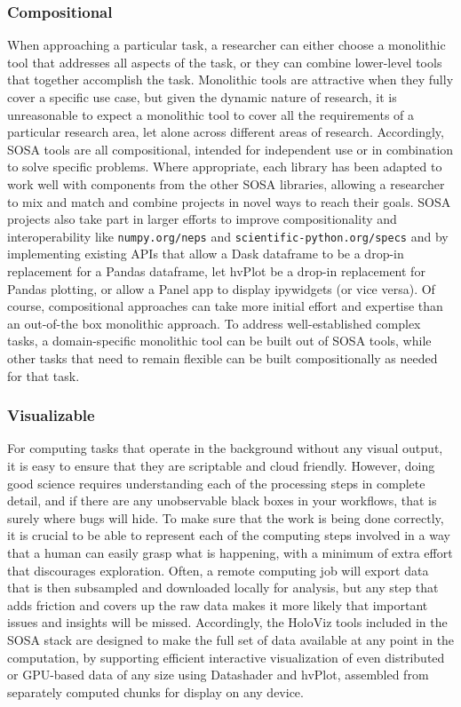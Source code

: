\subsubsection{Compositional}
When approaching a particular task, a researcher can either choose a monolithic tool that addresses all aspects of the task, or they can combine lower-level tools that together accomplish the task. Monolithic tools are attractive when they fully cover a specific use case, but given the dynamic nature of research, it is unreasonable to expect a monolithic tool to cover all the requirements of a particular research area, let alone across different areas of research. Accordingly, SOSA tools are all compositional, intended for independent use or in combination to solve specific problems. Where appropriate, each library has been adapted to work well with components from the other SOSA libraries, allowing a researcher to mix and match and combine projects in novel ways to reach their goals. SOSA projects also take part in larger efforts to improve compositionality and interoperability like \texttt{numpy.org/neps} and \texttt{scientific-python.org/specs} and by implementing existing APIs that allow a Dask dataframe to be a drop-in replacement for a Pandas dataframe, let hvPlot be a drop-in replacement for Pandas plotting, or allow a Panel app to display ipywidgets (or vice versa). Of course, compositional approaches can take more initial effort and expertise than an out-of-the box monolithic approach. To address well-established complex tasks, a domain-specific monolithic tool can be built out of SOSA tools, while other tasks that need to remain flexible can be built compositionally as needed for that task. 

\subsubsection{Visualizable}
For computing tasks that operate in the background without any visual output, it is easy to ensure that they are scriptable and cloud friendly. However, doing good science requires understanding each of the processing steps in complete detail, and if there are any unobservable black boxes in your workflows, that is surely where bugs will hide. To make sure that the work is being done correctly, it is crucial to be able to represent each of the computing steps involved in a way that a human can easily grasp what is happening, with a minimum of extra effort that discourages exploration. Often, a remote computing job will export data that is then subsampled and downloaded locally for analysis, but any step that adds friction and covers up the raw data makes it more likely that important issues and insights will be missed. Accordingly, the HoloViz tools included in the SOSA stack are designed to make the full set of data available at any point in the computation, by supporting efficient interactive visualization of even distributed or GPU-based data of any size using Datashader and hvPlot, assembled from separately computed chunks for display on any device.

